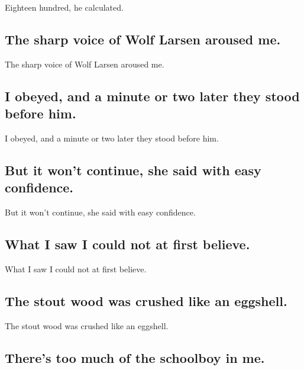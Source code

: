 \documentclass[]{article}
\begin{document}
Eighteen hundred, he calculated.

\hypertarget{the-sharp-voice-of-wolf-larsen-aroused-me.}{%
\subsection{The sharp voice of Wolf Larsen aroused
me.}\label{the-sharp-voice-of-wolf-larsen-aroused-me.}}

The sharp voice of Wolf Larsen aroused me.

\hypertarget{i-obeyed-and-a-minute-or-two-later-they-stood-before-him.}{%
\subsection{I obeyed, and a minute or two later they stood before
him.}\label{i-obeyed-and-a-minute-or-two-later-they-stood-before-him.}}

I obeyed, and a minute or two later they stood before him.

\hypertarget{but-it-wont-continue-she-said-with-easy-confidence.}{%
\subsection{But it won't continue, she said with easy
confidence.}\label{but-it-wont-continue-she-said-with-easy-confidence.}}

But it won't continue, she said with easy confidence.

\hypertarget{what-i-saw-i-could-not-at-first-believe.}{%
\subsection{What I saw I could not at first
believe.}\label{what-i-saw-i-could-not-at-first-believe.}}

What I saw I could not at first believe.

\hypertarget{the-stout-wood-was-crushed-like-an-eggshell.}{%
\subsection{The stout wood was crushed like an
eggshell.}\label{the-stout-wood-was-crushed-like-an-eggshell.}}

The stout wood was crushed like an eggshell.

\hypertarget{theres-too-much-of-the-schoolboy-in-me.}{%
\subsection{There's too much of the schoolboy in
me.}\label{theres-too-much-of-the-schoolboy-in-me.}}
\end{document}
